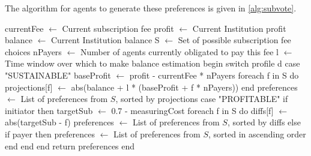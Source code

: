 The algorithm for agents to generate these preferences is given in \autoref{alg:subvote}.



\begin{pseudocode}[label=alg:subvote,caption={Subscription voting algorithm.}]
currentFee $\leftarrow$ Current subscription fee
profit $\leftarrow$ Current Institution profit
balance $\leftarrow$ Current Institution balance
S $\leftarrow$ Set of possible subscription fee choices
nPayers $\leftarrow$ Number of agents currently obligated to pay this fee
l $\leftarrow$ Time window over which to make balance estimation
begin
	switch profile d
		case "SUSTAINABLE"
			baseProfit $\leftarrow$ profit - currentFee * nPayers
			foreach f in S do
				projections[f] $\leftarrow$ abs(balance + l * (baseProfit + f * nPayers))
		end
		preferences $\leftarrow$ List of preferences from $S$, sorted by projections
		case "PROFITABLE"
			if initiator then
				targetSub $\leftarrow$ 0.7 - measuringCost
				foreach f in S do
					diffs[f] $\leftarrow$ abs(targetSub - f)
				preferences $\leftarrow$ List of preferences from $S$, sorted by diffs
			else if payer then
				preferences $\leftarrow$ List of preferences from $S$, sorted in ascending order
			end
		end
	end
	return preferences
end
\end{pseudocode}

